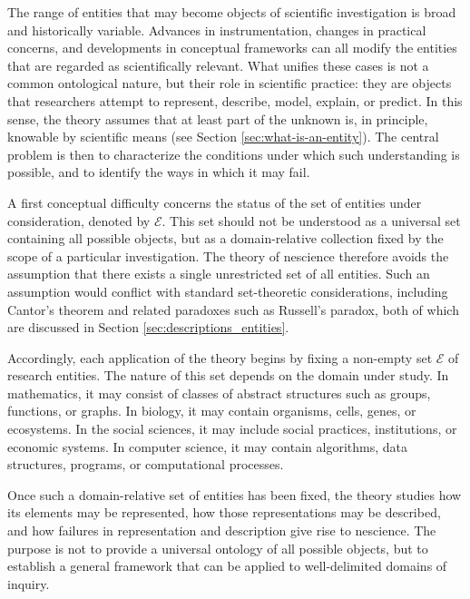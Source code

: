 The range of entities that may become objects of scientific investigation is broad and historically variable. Advances in instrumentation, changes in practical concerns, and developments in conceptual frameworks can all modify the entities that are regarded as scientifically relevant. What unifies these cases is not a common ontological nature, but their role in scientific practice: they are objects that researchers attempt to represent, describe, model, explain, or predict. In this sense, the theory assumes that at least part of the unknown is, in principle, knowable by scientific means (see Section \ref{sec:what-is-an-entity}). The central problem is then to characterize the conditions under which such understanding is possible, and to identify the ways in which it may fail.

A first conceptual difficulty concerns the status of the set of entities under consideration, denoted by $\mathcal{E}$. This set should not be understood as a universal set containing all possible objects, but as a domain-relative collection fixed by the scope of a particular investigation. The theory of nescience therefore avoids the assumption that there exists a single unrestricted set of all entities. Such an assumption would conflict with standard set-theoretic considerations, including Cantor's theorem and related paradoxes such as Russell's paradox, both of which are discussed in Section \ref{sec:descriptions_entities}.

Accordingly, each application of the theory begins by fixing a non-empty set $\mathcal{E}$ of research entities. The nature of this set depends on the domain under study. In mathematics, it may consist of classes of abstract structures such as groups, functions, or graphs. In biology, it may contain organisms, cells, genes, or ecosystems. In the social sciences, it may include social practices, institutions, or economic systems. In computer science, it may contain algorithms, data structures, programs, or computational processes.

Once such a domain-relative set of entities has been fixed, the theory studies how its elements may be represented, how those representations may be described, and how failures in representation and description give rise to nescience. The purpose is not to provide a universal ontology of all possible objects, but to establish a general framework that can be applied to well-delimited domains of inquiry.

%
%

